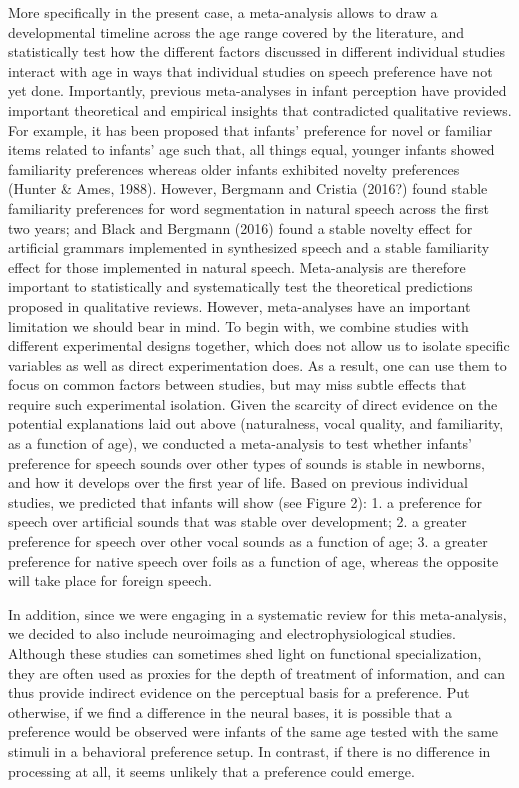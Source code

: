 \documentclass[]{apa6}
\begin{document}
More specifically in the present case, a meta-analysis allows to draw a
developmental timeline across the age range covered by the literature,
and statistically test how the different factors discussed in different
individual studies interact with age in ways that individual studies on
speech preference have not yet done. Importantly, previous meta-analyses
in infant perception have provided important theoretical and empirical
insights that contradicted qualitative reviews. For example, it has been
proposed that infants' preference for novel or familiar items related to
infants' age such that, all things equal, younger infants showed
familiarity preferences whereas older infants exhibited novelty
preferences (Hunter \& Ames, 1988). However, Bergmann and Cristia
(2016?) found stable familiarity preferences for word segmentation in
natural speech across the first two years; and Black and Bergmann (2016)
found a stable novelty effect for artificial grammars implemented in
synthesized speech and a stable familiarity effect for those implemented
in natural speech. Meta-analysis are therefore important to
statistically and systematically test the theoretical predictions
proposed in qualitative reviews. However, meta-analyses have an
important limitation we should bear in mind. To begin with, we combine
studies with different experimental designs together, which does not
allow us to isolate specific variables as well as direct experimentation
does. As a result, one can use them to focus on common factors between
studies, but may miss subtle effects that require such experimental
isolation. Given the scarcity of direct evidence on the potential
explanations laid out above (naturalness, vocal quality, and
familiarity, as a function of age), we conducted a meta-analysis to test
whether infants' preference for speech sounds over other types of sounds
is stable in newborns, and how it develops over the first year of life.
Based on previous individual studies, we predicted that infants will
show (see Figure 2): 1. a preference for speech over artificial sounds
that was stable over development; 2. a greater preference for speech
over other vocal sounds as a function of age; 3. a greater preference
for native speech over foils as a function of age, whereas the opposite
will take place for foreign speech.

In addition, since we were engaging in a systematic review for this
meta-analysis, we decided to also include neuroimaging and
electrophysiological studies. Although these studies can sometimes shed
light on functional specialization, they are often used as proxies for
the depth of treatment of information, and can thus provide indirect
evidence on the perceptual basis for a preference. Put otherwise, if we
find a difference in the neural bases, it is possible that a preference
would be observed were infants of the same age tested with the same
stimuli in a behavioral preference setup. In contrast, if there is no
difference in processing at all, it seems unlikely that a preference
could emerge.
\end{document}
